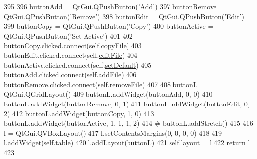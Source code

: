 \begin{DoxyCode}
395 
396         buttonAdd = QtGui.QPushButton(\textcolor{stringliteral}{'Add'})
397         buttonRemove = QtGui.QPushButton(\textcolor{stringliteral}{'Remove'})
398         buttonEdit = QtGui.QPushButton(\textcolor{stringliteral}{'Edit'})
399         buttonCopy = QtGui.QPushButton(\textcolor{stringliteral}{'Copy'})
400         buttonActive = QtGui.QPushButton(\textcolor{stringliteral}{'Set Active'})
401 
402         buttonCopy.clicked.connect(self.\hyperlink{classsoftware_1_1chipwhisperer_1_1common_1_1ui_1_1ParameterTypesCustom_1_1FilelistItem_ad5c94c3131dfeb4d1d78818aebc3e929}{copyFile})
403         buttonEdit.clicked.connect(self.\hyperlink{classsoftware_1_1chipwhisperer_1_1common_1_1ui_1_1ParameterTypesCustom_1_1FilelistItem_abb98ce8769757e449861b3fb5e7810a8}{editFile})
404         buttonActive.clicked.connect(self.\hyperlink{classsoftware_1_1chipwhisperer_1_1common_1_1ui_1_1ParameterTypesCustom_1_1FilelistItem_a34873216f7ac01e44383754ea1cb31ae}{setDefault})
405         buttonAdd.clicked.connect(self.\hyperlink{classsoftware_1_1chipwhisperer_1_1common_1_1ui_1_1ParameterTypesCustom_1_1FilelistItem_a0b9479fbacb422dee4e45e742c1ee664}{addFile})
406         buttonRemove.clicked.connect(self.\hyperlink{classsoftware_1_1chipwhisperer_1_1common_1_1ui_1_1ParameterTypesCustom_1_1FilelistItem_a5478f032f87fcf47b835fb04d5273cb5}{removeFile})
407 
408         buttonL = QtGui.QGridLayout()
409         buttonL.addWidget(buttonAdd, 0, 0)
410         buttonL.addWidget(buttonRemove, 0, 1)
411         buttonL.addWidget(buttonEdit, 0, 2)
412         buttonL.addWidget(buttonCopy, 1, 0)
413         buttonL.addWidget(buttonActive, 1, 1, 1, 2)
414         \textcolor{comment}{# buttonL.addStretch()}
415 
416         l = QtGui.QVBoxLayout()
417         l.setContentsMargins(0, 0, 0, 0)
418 
419         l.addWidget(self.\hyperlink{classsoftware_1_1chipwhisperer_1_1common_1_1ui_1_1ParameterTypesCustom_1_1FilelistItem_ab7a5ad52b06b011e6439238300ef1742}{table})
420         l.addLayout(buttonL)
421         self.\hyperlink{classsoftware_1_1chipwhisperer_1_1common_1_1ui_1_1ParameterTypesCustom_1_1FilelistItem_a1e595b0ba895184c302a17bf903b68d1}{layout} = l
422         \textcolor{keywordflow}{return} l
423 
\end{DoxyCode}
\hypertarget{classsoftware_1_1chipwhisperer_1_1common_1_1ui_1_1ParameterTypesCustom_1_1FilelistItem_a6463dd4e4f58d873f2e3dd4a0c09b034}{}
